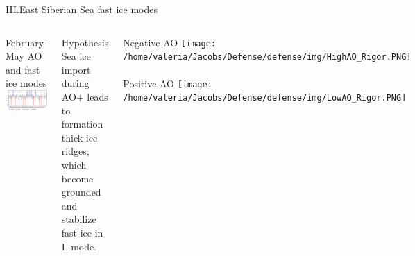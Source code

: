 \documentclass[8pt]{beamer}
\begin{document}
\setwatermark{\fontsize{125pt}{125pt}\selectfont{}}
\begin{frame}[fragile]{III.East Siberian Sea fast ice modes}
\begin{center}
\begin{columns}
	\centering
	February-May AO and fast ice modes
	\includegraphics[width=1\textwidth]{./img/AO.pdf}\\~\\
	\begin{block}{Hypothesis}
		Sea ice import during AO+ leads to formation thick ice ridges, which become grounded and stabilize fast ice in L-mode.
	\end{block}
	Negative AO
	\texttt{[image: /home/valeria/Jacobs/Defense/defense/img/HighAO\_Rigor.PNG]}\\~\\
	Positive AO
	\texttt{[image: /home/valeria/Jacobs/Defense/defense/img/LowAO\_Rigor.PNG]}
\end{columns}	


\end{center}
\end{frame}
\end{document}
